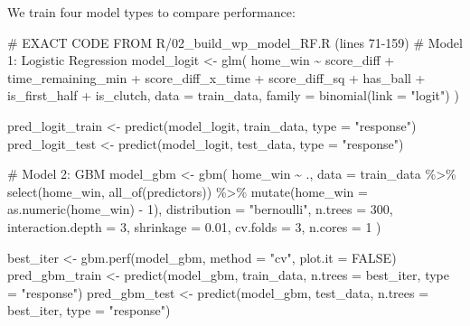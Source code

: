 \documentclass[
  letterpaper,
  DIV=11,
  numbers=noendperiod]{scrartcl}
\newenvironment{Shaded}{\begin{snugshade}}{\end{snugshade}}
\newcommand{\AttributeTok}[1]{\textcolor[rgb]{0.40,0.45,0.13}{#1}}
\newcommand{\CommentTok}[1]{\textcolor[rgb]{0.37,0.37,0.37}{#1}}
\newcommand{\ConstantTok}[1]{\textcolor[rgb]{0.56,0.35,0.01}{#1}}
\newcommand{\DecValTok}[1]{\textcolor[rgb]{0.68,0.00,0.00}{#1}}
\newcommand{\FloatTok}[1]{\textcolor[rgb]{0.68,0.00,0.00}{#1}}
\newcommand{\FunctionTok}[1]{\textcolor[rgb]{0.28,0.35,0.67}{#1}}
\newcommand{\NormalTok}[1]{\textcolor[rgb]{0.00,0.23,0.31}{#1}}
\newcommand{\OtherTok}[1]{\textcolor[rgb]{0.00,0.23,0.31}{#1}}
\newcommand{\SpecialCharTok}[1]{\textcolor[rgb]{0.37,0.37,0.37}{#1}}
\newcommand{\StringTok}[1]{\textcolor[rgb]{0.13,0.47,0.30}{#1}}
\begin{document}
We train four model types to compare performance:

\begin{Shaded}
\begin{Highlighting}[]
\CommentTok{\# EXACT CODE FROM R/02\_build\_wp\_model\_RF.R (lines 71{-}159)}
\CommentTok{\# Model 1: Logistic Regression}
\NormalTok{model\_logit }\OtherTok{\textless{}{-}} \FunctionTok{glm}\NormalTok{(}
\NormalTok{  home\_win }\SpecialCharTok{\textasciitilde{}}\NormalTok{ score\_diff }\SpecialCharTok{+}\NormalTok{ time\_remaining\_min }\SpecialCharTok{+}\NormalTok{ score\_diff\_x\_time }\SpecialCharTok{+}
\NormalTok{    score\_diff\_sq }\SpecialCharTok{+}\NormalTok{ has\_ball }\SpecialCharTok{+}\NormalTok{ is\_first\_half }\SpecialCharTok{+}\NormalTok{ is\_clutch,}
  \AttributeTok{data =}\NormalTok{ train\_data,}
  \AttributeTok{family =} \FunctionTok{binomial}\NormalTok{(}\AttributeTok{link =} \StringTok{"logit"}\NormalTok{)}
\NormalTok{)}

\NormalTok{pred\_logit\_train }\OtherTok{\textless{}{-}} \FunctionTok{predict}\NormalTok{(model\_logit, train\_data, }\AttributeTok{type =} \StringTok{"response"}\NormalTok{)}
\NormalTok{pred\_logit\_test }\OtherTok{\textless{}{-}} \FunctionTok{predict}\NormalTok{(model\_logit, test\_data, }\AttributeTok{type =} \StringTok{"response"}\NormalTok{)}

\CommentTok{\# Model 2: GBM}
\NormalTok{model\_gbm }\OtherTok{\textless{}{-}} \FunctionTok{gbm}\NormalTok{(}
\NormalTok{  home\_win }\SpecialCharTok{\textasciitilde{}}\NormalTok{ .,}
  \AttributeTok{data =}\NormalTok{ train\_data }\SpecialCharTok{\%\textgreater{}\%} \FunctionTok{select}\NormalTok{(home\_win, }\FunctionTok{all\_of}\NormalTok{(predictors)) }\SpecialCharTok{\%\textgreater{}\%}
    \FunctionTok{mutate}\NormalTok{(}\AttributeTok{home\_win =} \FunctionTok{as.numeric}\NormalTok{(home\_win) }\SpecialCharTok{{-}} \DecValTok{1}\NormalTok{),}
  \AttributeTok{distribution =} \StringTok{"bernoulli"}\NormalTok{,}
  \AttributeTok{n.trees =} \DecValTok{300}\NormalTok{,}
  \AttributeTok{interaction.depth =} \DecValTok{3}\NormalTok{,}
  \AttributeTok{shrinkage =} \FloatTok{0.01}\NormalTok{,}
  \AttributeTok{cv.folds =} \DecValTok{3}\NormalTok{,}
  \AttributeTok{n.cores =} \DecValTok{1}
\NormalTok{)}

\NormalTok{best\_iter }\OtherTok{\textless{}{-}} \FunctionTok{gbm.perf}\NormalTok{(model\_gbm, }\AttributeTok{method =} \StringTok{"cv"}\NormalTok{, }\AttributeTok{plot.it =} \ConstantTok{FALSE}\NormalTok{)}
\NormalTok{pred\_gbm\_train }\OtherTok{\textless{}{-}} \FunctionTok{predict}\NormalTok{(model\_gbm, train\_data, }\AttributeTok{n.trees =}\NormalTok{ best\_iter, }\AttributeTok{type =} \StringTok{"response"}\NormalTok{)}
\NormalTok{pred\_gbm\_test }\OtherTok{\textless{}{-}} \FunctionTok{predict}\NormalTok{(model\_gbm, test\_data, }\AttributeTok{n.trees =}\NormalTok{ best\_iter, }\AttributeTok{type =} \StringTok{"response"}\NormalTok{)}



\end{Highlighting}
\end{Shaded}
\end{document}
